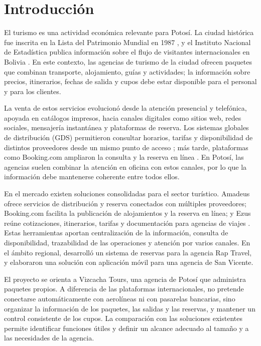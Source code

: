 \chapter{Introducción}
\label{cap:introduccion}

El turismo es una actividad económica relevante para Potosí. La ciudad
histórica fue inscrita en la Lista del Patrimonio Mundial en 1987
\parencite{unescoPotosi}, y el Instituto Nacional de Estadística publica
información sobre el flujo de visitantes internacionales en Bolivia
\parencite{ineVisitantes}. En este contexto, las agencias de turismo de la
ciudad ofrecen paquetes que combinan transporte, alojamiento, guías y
actividades; la información sobre precios, itinerarios, fechas de salida y
cupos debe estar disponible para el personal y para los clientes.

La venta de estos servicios evolucionó desde la atención presencial y
telefónica, apoyada en catálogos impresos, hacia canales digitales como
sitios web, redes sociales, mensajería instantánea y plataformas de reserva.
Los sistemas globales de distribución (GDS) permitieron consultar horarios,
tarifas y disponibilidad de distintos proveedores desde un mismo punto de
acceso \parencite{amadeusGDS}; más tarde, plataformas como Booking.com
ampliaron la consulta y la reserva en línea \parencite{booking}. En Potosí,
las agencias suelen combinar la atención en oficina con estos canales, por lo
que la información debe mantenerse coherente entre todos ellos.

En el mercado existen soluciones consolidadas para el sector turístico.
Amadeus ofrece servicios de distribución y reserva conectados con múltiples
proveedores; Booking.com facilita la publicación de alojamientos y la reserva
en línea; y Ezus reúne cotizaciones, itinerarios, tarifas y documentación para
agencias de viajes \parencite{ezus}. Estas herramientas aportan
centralización de la información, consulta de disponibilidad, trazabilidad de
las operaciones y atención por varios canales. En el ámbito regional,
\textcite{huaman2017} desarrolló un sistema de reservas para la agencia Rap
Travel, y \textcite{miranda2022} elaboraron una solución con aplicación móvil
para una agencia de San Vicente.

El proyecto se orienta a Vizcacha Tours, una agencia de Potosí que administra
paquetes propios. A diferencia de las plataformas internacionales, no
pretende conectarse automáticamente con aerolíneas ni con pasarelas
bancarias, sino organizar la información de los paquetes, las salidas y las
reservas, y mantener un control consistente de los cupos. La comparación con
las soluciones existentes permite identificar funciones útiles y definir un
alcance adecuado al tamaño y a las necesidades de la agencia.
